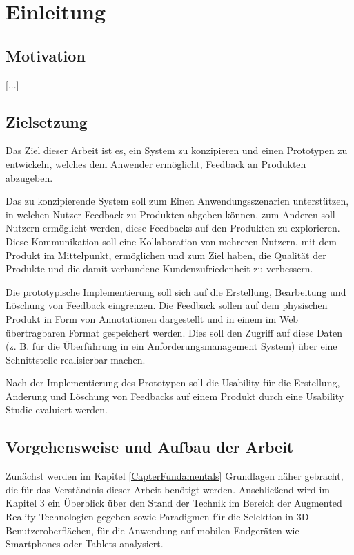 \chapter{Einleitung}

\section{Motivation}

[...]

\section{Zielsetzung}

Das Ziel dieser Arbeit ist es, ein System zu konzipieren und einen Prototypen zu entwickeln, welches dem Anwender ermöglicht, Feedback an Produkten
abzugeben. 

Das zu konzipierende System soll zum Einen Anwendungsszenarien unterstützen, in welchen Nutzer Feedback zu Produkten abgeben können, 
zum Anderen soll Nutzern ermöglicht werden, diese Feedbacks auf den Produkten zu explorieren. 
Diese Kommunikation soll eine Kollaboration von mehreren Nutzern, mit dem Produkt im Mittelpunkt, ermöglichen und zum Ziel haben, die Qualität der 
Produkte und die damit verbundene Kundenzufriedenheit zu verbessern.

Die prototypische Implementierung soll sich auf die Erstellung, Bearbeitung und Löschung von Feedback eingrenzen. Die Feedback sollen auf dem physischen 
Produkt in Form von Annotationen dargestellt und in einem im Web übertragbaren Format gespeichert werden. Dies soll den Zugriff auf diese Daten 
(z. B. für die Überführung in ein Anforderungsmanagement System) über eine Schnittstelle realisierbar machen.  

Nach der Implementierung des Prototypen soll die Usability für die Erstellung, Änderung und Löschung von Feedbacks auf einem Produkt durch 
eine Usability Studie evaluiert werden. 

\section{Vorgehensweise und Aufbau der Arbeit}

Zunächst werden im Kapitel \ref{CapterFundamentals} Grundlagen näher gebracht, die für das Verständnis dieser Arbeit benötigt werden. Anschließend wird 
im Kapitel 3 ein Überblick über den Stand der Technik im Bereich der Augmented Reality Technologien gegeben sowie Paradigmen für die Selektion in 3D Benutzeroberflächen, 
für die Anwendung auf mobilen Endgeräten wie Smartphones oder Tablets analysiert.  
 
